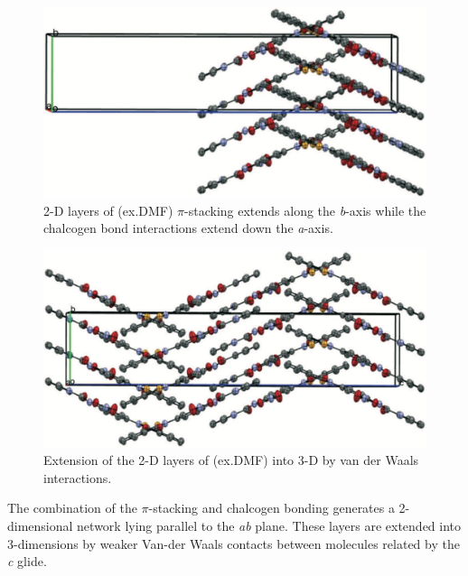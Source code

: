 \begin{refsection}
\begin{figure}
    \centering
    \includegraphics[width=0.8\linewidth]{Figures/ebs-nitroamide-2py-pi-stacking.pdf}
    \caption{2-D layers of (ex.DMF) $\pi$-stacking extends along the \emph{b}-axis while the  chalcogen bond interactions extend down the \emph{a}-axis.}
    \label{fig:ebs-nitroamide-2py-pi-stacking}
\end{figure}

\begin{figure}
    \centering
    \includegraphics[width=0.8\linewidth]{Figures/ebs-nitroamide-2py-3d.pdf}
    \caption{Extension of the 2-D layers of (ex.DMF) into 3-D by van der Waals interactions.}
    \label{fig:ebs-nitroamide-2py-3d}
\end{figure}

The combination of the $\pi$-stacking and chalcogen bonding generates a 2-dimensional network lying parallel to the \emph{ab} plane.
These layers are extended into 3-dimensions by weaker Van-der Waals contacts between molecules related by the \emph{c} glide.


\end{refsection}
